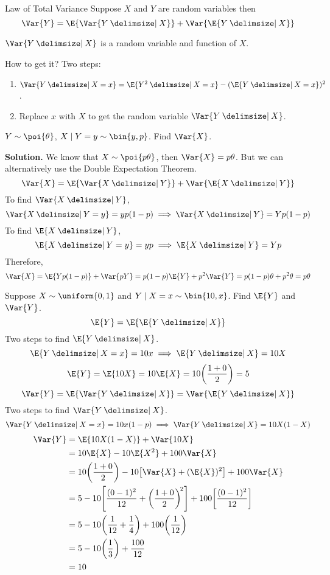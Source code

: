 \begin{Theorem}{Law of Total Variance}{}
    Suppose $ X $ and $ Y $ are random variables then
    \[ \Var{Y}=\E{\Var{Y\given X}}+\Var{\E{Y\given X}} \]
\end{Theorem}
\begin{Remark}{}{}
    $ \Var{Y\given X} $ is a random variable and function of $ X $.

    How to get it? Two steps:
    \begin{enumerate}
        \item $ \Var{Y\given X=x}=\E{Y^2\given X=x}-(\E{Y\given X=x})^2 $.
        \item Replace $ x $ with $ X $ to get
              the random variable $ \Var{Y\given X} $.
    \end{enumerate}
\end{Remark}
\begin{Example}{}{}
    $ Y \sim \poi{\theta} $, $ X\mid Y=y \sim \bin{y,p} $. Find
    $ \Var{X} $.

    \textbf{Solution.} We know that $ X \sim \poi{p\theta} $,
    then $ \Var{X}=p\theta $. But we can alternatively
    use the Double Expectation Theorem.
    \[ \Var{X}=\E{\Var{X\given Y}}+\Var{\E{X\given Y}} \]
    To find $ \Var{X\given Y} $,
    \[ \Var{X\given Y=y}=yp(1-p)\implies \Var{X\given Y}=Yp(1-p) \]
    To find $ \E{X\given Y} $,
    \[ \E{X\given Y=y}=yp\implies \E{X\given Y}=Yp \]
    Therefore,
    \[ \Var{X}=\E{Yp(1-p)}+\Var{pY}=p(1-p)\E{Y}+p^2\Var{Y}=
        p(1-p)\theta+p^2\theta=p\theta \]
\end{Example}
\begin{Example}{}{}
    Suppose $ X \sim \uniform{0,1} $ and
    $ Y\mid X=x \sim \bin{10,x} $. Find $ \E{Y} $
    and $ \Var{Y} $.
    \[ \E{Y}=\E{\E{Y\given X}} \]
    Two steps to find $ \E{Y\given X} $.
    \[ \E{Y\given X=x}=10x\implies \E{Y\given X}=10X \]
    \[ \E{Y}=\E{10X}=10\E{X}=10\biggl( \frac{1+0}{2} \biggr)=5 \]
    \[ \Var{Y}=\E{\Var{Y\given X}}=\Var{\E{Y\given X}} \]
    Two steps to find $ \Var{Y\given X} $.
    \[ \Var{Y\given X=x}=10x(1-p)\implies\Var{Y\given X}=10X(1-X) \]
    \begin{align*}
        \Var{Y}
         & =\E{10X(1-X)}+\Var{10X}                                                       \\
         & =10\E{X}-10\E{X^2}+100\Var{X}                                                 \\
         & =10\biggl( \frac{1+0}{2} \biggr)-
        10\bigl[ \Var{X}+(\E{X})^2 \bigr]+100\Var{X}                                     \\
         & =5-10\Biggl[ \frac{(0-1)^2}{12}+\biggl( \frac{1+0}{2} \biggr)^{\!2}  \Biggr]+
        100\biggl[ \frac{(0-1)^2}{12} \biggr]                                            \\
         & =5-10\biggl( \frac{1}{12} +\frac{1}{4}  \biggr)+
        100\biggl( \frac{1}{12} \biggr)                                                  \\
         & =5-10\biggl( \frac{1}{3} \biggr)+\frac{100}{12}                               \\
         & =10
    \end{align*}
\end{Example}
